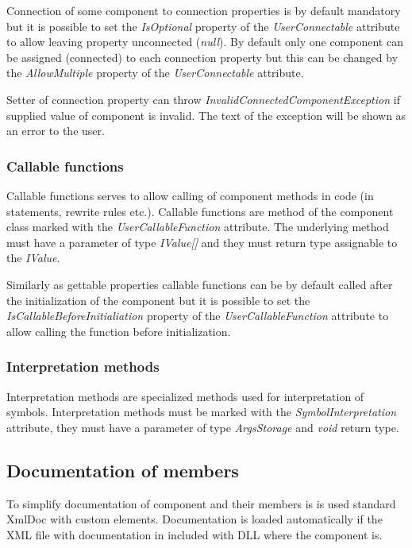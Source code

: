 Connection of some component to connection properties is by default mandatory but it is possible to set the \emph{IsOptional} property of the \emph{UserConnectable} attribute to allow leaving property unconnected (\emph{null}).
By default only one component can be assigned (connected) to each connection property but this can be changed by the \emph{AllowMultiple} property of the \emph{UserConnectable} attribute.

Setter of connection property can throw \emph{InvalidConnectedComponentException} if supplied value of component is invalid.
The text of the exception will be shown as an error to the user.


\subsubsection{Callable functions}

Callable functions serves to allow calling of component methods in \lsystem code (in statements, rewrite rules etc.).
Callable functions are method of the component class marked with the \emph{UserCallableFunction} attribute.
The underlying method must have a parameter of type \emph{IValue[]} and they must return type assignable to the \emph{IValue}.

Similarly as gettable properties callable functions can be by default called after the initialization of the component but it is possible to set the \emph{IsCallableBeforeInitialiation} property of the \emph{UserCallableFunction} attribute to allow calling the function before initialization.


\subsubsection{Interpretation methods}

Interpretation methods are specialized methods used for interpretation of symbols.
Interpretation methods must be marked with the \emph{SymbolInterpretation} attribute, they must have a parameter of type \emph{ArgsStorage} and \emph{void} return type.


\subsection{Documentation of members}
\label{sec:componentDoc}

To simplify documentation of component and their members is is used standard XmlDoc with custom elements.
Documentation is loaded automatically if the XML file with documentation in included with DLL where the component is.

